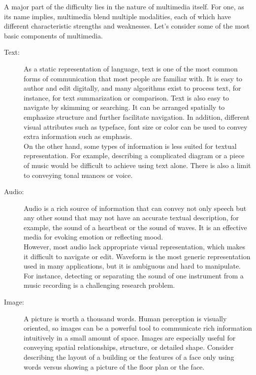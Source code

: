 A major part of the difficulty lies in the nature of multimedia itself. For one, as its name implies, multimedia blend multiple modalities, each of which have different characteristic strengths and weaknesses. Let's consider some of the most basic components of multimedia.
\begin{description}
\item[Text:] As a static representation of language, text is one of the most common forms of communication that most people are familiar with. It is easy to author and edit digitally, and many algorithms exist to process text, for instance, for text summarization or comparison. Text is also easy to navigate by skimming or searching. It can be arranged spatially to emphasize structure and further facilitate navigation. In addition, different visual attributes such as typeface, font size or color can be used to convey extra information such as emphasis.\\
On the other hand, some types of information is less suited for textual representation. For example, describing a complicated diagram or a piece of music would be difficult to achieve using text alone. There is also a limit to conveying tonal nuances or voice. \\
\item[Audio:] Audio is a rich source of information that can convey not only speech but any other sound that may not have an accurate textual description, for example, the sound of a heartbeat or the sound of waves. It is an effective media for evoking emotion or reflecting mood.\\
However, most audio lack appropriate visual representation, which makes it difficult to navigate or edit. Waveform is the most generic representation used in many applications, but it is ambiguous and hard to manipulate. For instance, detecting or separating the sound of one instrument from a music recording is a challenging research problem.\\
\item[Image:] A picture is worth a thousand words. Human perception is visually oriented, so images can be a powerful tool to communicate rich information intuitively in a small amount of space. Images are especially useful for conveying spatial relationships, structure, or detailed shape. Consider describing the layout of a building or the features of a face only using words versus showing a picture of the floor plan or the face.\\ 

\end{description}
